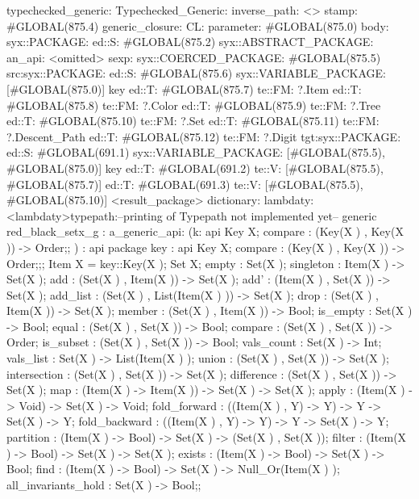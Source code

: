 typechecked_generic:
Typechecked_Generic:
inverse_path: <>
stamp: #GLOBAL(875.4)
generic_closure:
CL:
parameter: #GLOBAL(875.0)
body: syx::PACKAGE:
        ed::S: #GLOBAL(875.2)
            syx::ABSTRACT_PACKAGE:
                an_api: <omitted>
                sexp:
                    syx::COERCED_PACKAGE:
                        #GLOBAL(875.5)
                         src:syx::PACKAGE:
                                ed::S: #GLOBAL(875.6) syx::VARIABLE_PACKAGE: [#GLOBAL(875.0)] key
                                ed::T: #GLOBAL(875.7) te::FM: ?.Item
                                ed::T: #GLOBAL(875.8) te::FM: ?.Color
                                ed::T: #GLOBAL(875.9) te::FM: ?.Tree
                                ed::T: #GLOBAL(875.10) te::FM: ?.Set
                                ed::T: #GLOBAL(875.11) te::FM: ?.Descent_Path
                                ed::T: #GLOBAL(875.12) te::FM: ?.Digit
                        tgt:syx::PACKAGE:
                            ed::S: #GLOBAL(691.1)
                             syx::VARIABLE_PACKAGE:
                             [#GLOBAL(875.5), #GLOBAL(875.0)]
                             key
                            ed::T: #GLOBAL(691.2)
                             te::V:
                             [#GLOBAL(875.5), #GLOBAL(875.7)]
                            ed::T: #GLOBAL(691.3)
                             te::V:
                             [#GLOBAL(875.5), #GLOBAL(875.10)]
         <result_package>
dictionary:
lambdaty:
  <lambdaty>typepath:--printing of Typepath not implemented yet--
generic red_black_setx_g
:
a_generic_api:
(k:
api {
    Key X;
    compare : (Key(X ) , Key(X )) -> Order;};
)
:
api {   package key
          : api {
                Key X;
                compare : (Key(X ) , Key(X )) -> Order;};;
    Item X = key::Key(X );
    Set X;
    empty : Set(X );
    singleton : Item(X ) -> Set(X );
    add : (Set(X ) , Item(X )) -> Set(X );
    add' : (Item(X ) , Set(X )) -> Set(X );
    add_list : (Set(X ) , List(Item(X ) )) -> Set(X );
    drop : (Set(X ) , Item(X )) -> Set(X );
    member : (Set(X ) , Item(X )) -> Bool;
    is_empty : Set(X ) -> Bool;
    equal : (Set(X ) , Set(X )) -> Bool;
    compare : (Set(X ) , Set(X )) -> Order;
    is_subset : (Set(X ) , Set(X )) -> Bool;
    vals_count : Set(X ) -> Int;
    vals_list : Set(X ) -> List(Item(X ) );
    union : (Set(X ) , Set(X )) -> Set(X );
    intersection : (Set(X ) , Set(X )) -> Set(X );
    difference : (Set(X ) , Set(X )) -> Set(X );
    map : (Item(X ) -> Item(X )) -> Set(X ) -> Set(X );
    apply : (Item(X ) -> Void) -> Set(X ) -> Void;
    fold_forward : ((Item(X ) , Y) -> Y) -> Y -> Set(X ) -> Y;
    fold_backward : ((Item(X ) , Y) -> Y) -> Y -> Set(X ) -> Y;
    partition : (Item(X ) -> Bool) -> Set(X ) -> (Set(X ) , Set(X ));
    filter : (Item(X ) -> Bool) -> Set(X ) -> Set(X );
    exists : (Item(X ) -> Bool) -> Set(X ) -> Bool;
    find : (Item(X ) -> Bool) -> Set(X ) -> Null_Or(Item(X ) );
    all_invariants_hold : Set(X ) -> Bool;};
